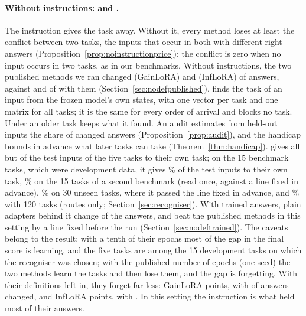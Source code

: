 \paragraph{Without instructions: \recog{} and \handicap{}.} The instruction gives the task away.
Without it, every method loses at least the conflict between two tasks, the inputs that occur in both
with different right answers (Proposition~\ref{prop:noinstructionprice}); the conflict is zero when no
input occurs in two tasks, as in our benchmarks. Without instructions, the two published methods we ran
changed \AudSeedsGainloraChanged{} (GainLoRA) and \AudSeedsInfloraChanged{} (InfLoRA) of
\AudSeedsCompared{} answers, against \FiveGainChanged{} and \FiveInfChanged{} of \FiveGainCompared{}
with them (Section~\ref{sec:nodefpublished}). \recog{} finds the task of an input from the frozen
model's own states, with one vector per task and one matrix for all tasks; it is the same for every
order of arrival and blocks no task. Under \handicap{} an older task keeps what it found. An audit
estimates from held-out inputs the share of changed answers (Proposition~\ref{prop:audit}), and the
handicap bounds in advance what later tasks can take (Theorem~\ref{thm:handicap}). \recog{} gives all
but \AudRouteFiveRidgeNotOwn{} of the \AudRouteFiveRidgeN{} test inputs of the five tasks to their own
task; on the 15 benchmark tasks, which were development data, it gives \AudDevLLamOneEnd{}\% of the test inputs to their own task, \AudScaleLongThreeEnd{}\% on the 15 tasks of a second benchmark (read once, against a line fixed
in advance), \AudFreshFourthLEnd{}\% on 30 unseen tasks, where it passed the line fixed in advance, and \AudScaleAllHundredTwentyEnd{}\% with 120 tasks (routes only;
Section~\ref{sec:recogniser}). With trained answers, plain adapters behind it change
\AudSeedsRidgeChanged{} of the \AudSeedsCompared{} answers, and beat the published methods in this
setting by a line fixed before the run (Section~\ref{sec:nodeftrained}). The caveats belong to the
result: with a tenth of their epochs most of the gap in the final score is learning, and the five tasks are among the 15 development tasks on which the recogniser was chosen; with the
published number of epochs (one seed) the two methods learn the tasks and then lose them, and the gap
is forgetting. With their definitions left in, they forget far less: GainLoRA \AudFullDefOriginalGainloraFTOne{} points, with
\AudFullDefOriginalGainloraChanged{} of \AudFullDefCompared{} answers changed, and InfLoRA \AudFullDefOriginalInfloraFTOne{} points, with \AudFullDefOriginalInfloraChanged{}. In this setting the
instruction is what held most of their answers.

